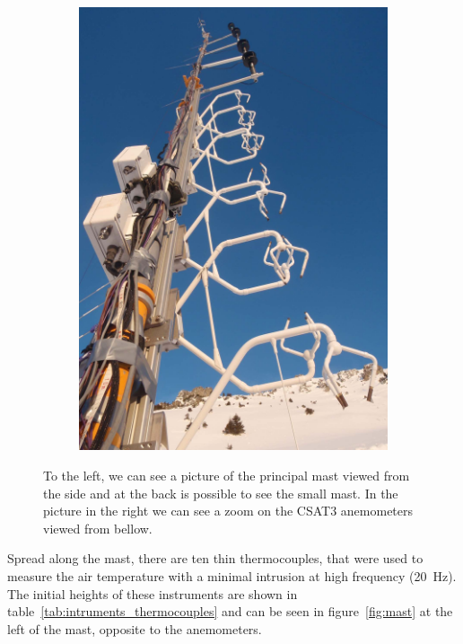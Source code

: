 \begin{figure}[!ht]
\begin{subfigure}[b]{0.4\textwidth}
        \includegraphics[width=\textwidth]{fig/chapter_3/foto_3_small.jpg}
    \end{subfigure}
    \caption{To the left, we can see a picture of the principal mast viewed from the side and at the back is possible to see the small mast. In the picture in the right we can see a zoom on the CSAT3 anemometers viewed from bellow.}
    \label{fig:mast_pics}
\end{figure}

Spread along the mast, there are ten thin thermocouples, that were used to measure the air temperature with a minimal intrusion at high frequency (20~Hz). The initial heights of these instruments are shown in table~\ref{tab:intruments_thermocouples} and can be seen in figure~\ref{fig:mast} at the left of the mast, opposite to the anemometers.

